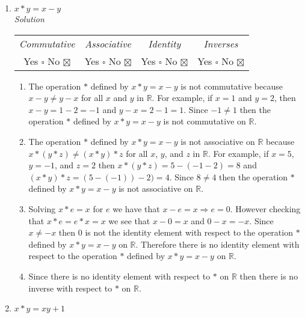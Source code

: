 \documentclass[12pt]{article}
\begin{document}
\begin{flushleft}
\begin{enumerate}
\begin{enumerate}
            \end{enumerate} 
          \item $x * y = x - y $ \\
            \medskip
            \textit{Solution}
            \medskip
            \begin{tabular}{c c c c}
              \textit{Commutative} & \textit{Associative} & \textit{Identity} & \textit{Inverses} \\
                Yes $\square$ No $\boxtimes$ & Yes $\square$ No $\boxtimes$ & Yes $\square$  No $\boxtimes$ & Yes $\square$ No $\boxtimes$ \\
            \end{tabular}
            \begin{enumerate}
              \item The operation $*$ defined by $x * y = x - y$ is not commutative because $x - y \neq y - x$ 
                for all $x$ and $y$ in $\mathbb{R}$. For example, if $x = 1$ and $y = 2$, then 
                $x - y = 1 - 2 = -1$ and $y - x = 2 - 1 = 1$. Since $-1 \neq 1$ then the operation 
                $*$ defined by $x * y = x - y$ is not commutative on $\mathbb{R}$.	
              \item The operation $*$ defined by $x * y = x - y$ is not associative on $\mathbb{R}$ because 
                $x * (y * z) \neq (x * y) * z$ for all $x$, $y$, and $z$ in $\mathbb{R}$. For example, 
                if $x = 5$, $y = -1$, and $z = 2$ then $x * (y * z) = 5-(-1-2) = 8$ and $(x * y) * z = (5 - (-1)) -2) = 4$. 
                Since $8 \neq 4$ then the operation $*$ defined by $x * y = x - y$ is not associative on $\mathbb{R}$.
              \item Solving $x * e = x$ for $e$ we have that $x - e = x \Rightarrow e = 0$. However checking 
                that $x * e = e * x = x$ we see that $x - 0 = x$ and $0 - x = -x$. Since $x \neq -x$ then 
                $0$ is not the identity element with respect to the operation $*$ defined by $x * y = x - y$ 
                on $\mathbb{R}$. Therefore there is no identity element with respect to the operation $*$ 
                defined by $x * y = x - y$ on $\mathbb{R}$.
              \item Since there is no identity element with respect to $*$ on $\mathbb{R}$ then there 
                is no inverse with respect to $*$ on $\mathbb{R}$.
            \end{enumerate}
					\item $x * y = xy + 1 $ \\

\end{enumerate}
\end{flushleft}
\end{document}
